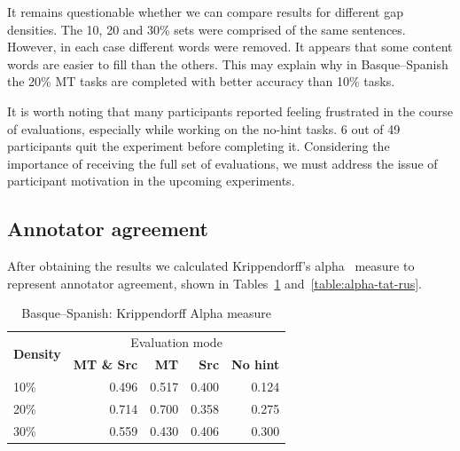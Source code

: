 \documentclass[11pt]{article}
\newcommand{\comment}[1]{\marginpar{\scriptsize\sf \textcolor{blue}{#1}}}
\begin{document}
It remains questionable whether we can compare results for different gap densities. The 10, 20 and 30\% sets were comprised
of the same sentences. However, in each case different words were removed. It appears
that some content words are easier to fill than the others. This may explain why in
Basque--Spanish the 20\% MT tasks are completed with better accuracy than 10\% tasks.\comment{MLF: I think this shows that our statistics are weak, should we say something to excuse ourselves?}

It is worth noting that many participants reported feeling frustrated in
the course of evaluations, especially while working on the no-hint tasks. 6 out of 49
participants quit the experiment before completing it. Considering the importance of receiving the full set of evaluations, we must address the issue of participant motivation in the upcoming experiments.

\subsection{Annotator agreement}\comment{MLF cannot get these tables to appear numbered later than the other ones!}
After obtaining the results we calculated Krippendorff's alpha~\citep{krippendorff70} measure to represent annotator agreement, shown in Tables~\ref{table:alpha-eus-spa} and~\ref{table:alpha-tat-rus}. 
\begin{table}
\centering
  \begin{tabular}{|l|r|r|r|r|}
  \hline
 \multirow{2}{*}{\textbf{Density}} & \multicolumn{4}{|c|}{Evaluation mode} \\\cline{2-5}
                                            & \textbf{MT \& Src} & \textbf{MT} & \textbf{Src} & \textbf{No hint} \\
\hline
10\%&0.496&0.517&0.400&0.124\\
20\%&0.714&0.700&0.358&0.275\\
30\%&0.559&0.430&0.406&0.300\\

\hline
\end{tabular}
\caption {Basque--Spanish: Krippendorff Alpha measure} 
\label{table:alpha-eus-spa}
\end{table}
\end{document}
